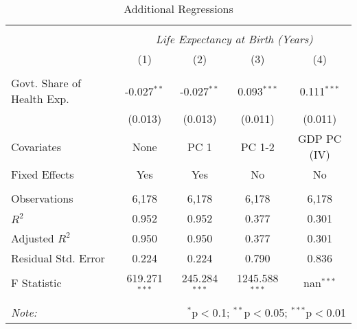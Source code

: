 \begin{table}[!htbp] \centering
  \caption{Additional Regressions \label{additional_regs}}
\begin{tabular}{@{\extracolsep{5pt}}lcccc}
\\[-1.8ex]\hline
\hline \\[-1.8ex]
& \multicolumn{4}{c}{\textit{Life Expectancy at Birth (Years)}} \
\cr \
\\[-1.8ex] & (1) & (2) & (3) & (4) \\
\hline \\[-1.8ex]
 Govt. Share of Health Exp. & -0.027$^{**}$ & -0.027$^{**}$ & 0.093$^{***}$ & 0.111$^{***}$ \\
  & (0.013) & (0.013) & (0.011) & (0.011) \\
 Covariates & None & PC 1 & PC 1-2 & GDP PC (IV) \\
 Fixed Effects & Yes & Yes & No & No \\
\hline \\[-1.8ex]
 Observations & 6,178 & 6,178 & 6,178 & 6,178 \\
 $R^2$ & 0.952 & 0.952 & 0.377 & 0.301 \\
 Adjusted $R^2$ & 0.950 & 0.950 & 0.377 & 0.301 \\
 Residual Std. Error & 0.224 & 0.224 & 0.790 & 0.836  \\
 F Statistic & 619.271$^{***}$  & 245.284$^{***}$  & 1245.588$^{***}$  & nan$^{***}$  \\
\hline
\hline \\[-1.8ex]
\textit{Note:} & \multicolumn{4}{r}{$^{*}$p$<$0.1; $^{**}$p$<$0.05; $^{***}$p$<$0.01} \\
\end{tabular}
\end{table}